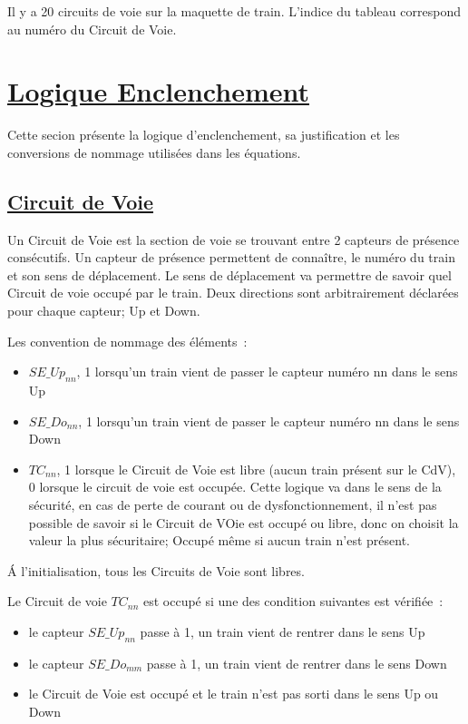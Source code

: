 Il y a 20 circuits de voie sur la maquette de train. L'indice du
tableau correspond au numéro du Circuit de Voie.




\newpage
\section{\underline{Logique Enclenchement}}
\label{sec:log_enc}

Cette secion présente la logique d'enclenchement, sa justification et
les conversions de nommage utilisées dans les équations.

\subsection{\underline{Circuit de Voie}}
\label{sec:CdV}

Un Circuit de Voie est la section de voie se trouvant entre 2 capteurs
de présence consécutifs. Un capteur de présence permettent de
connaître, le numéro du train et son sens de déplacement. Le sens de
déplacement va permettre de savoir quel Circuit de voie occupé par le
train. Deux directions sont arbitrairement déclarées pour chaque
capteur; Up et Down.

Les convention de nommage des éléments~:
\begin{itemize}
\item $SE\_Up_{nn}$, 1 lorsqu'un train vient de passer le capteur numéro
  nn dans le sens Up
\item $SE\_Do_{nn}$, 1 lorsqu'un train vient de passer le capteur numéro
  nn dans le sens Down
\item $TC_{nn}$, 1 lorsque le Circuit de Voie est libre (aucun train
  présent sur le CdV), 0 lorsque le circuit de voie est occupée. Cette
  logique va dans le sens de la sécurité, en cas de perte de courant
  ou de dysfonctionnement, il n'est pas possible de savoir si le
  Circuit de VOie est occupé ou libre, donc on choisit la valeur la
  plus sécuritaire; Occupé même si aucun train n'est présent.
\end{itemize}

\'A l'initialisation, tous les Circuits de Voie sont libres.

\medskip
Le Circuit de voie $TC_{nn}$ est occupé si une des condition suivantes
est vérifiée~:
\begin{itemize}
\item le capteur $SE\_Up_{nn}$ passe à 1, un train vient de rentrer dans
  le sens Up
\item le capteur $SE\_Do_{mm}$ passe à 1, un train vient de rentrer dans
  le sens Down
\item le Circuit de Voie est occupé et le train n'est pas sorti dans
  le sens Up ou Down
\end{itemize}

